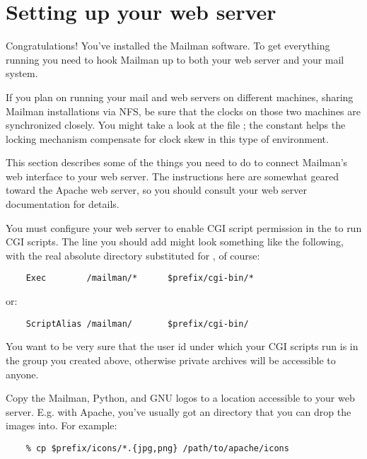 \documentclass{howto}
\begin{document}
\section{Setting up your web server}

Congratulations!  You've installed the Mailman software.  To get everything
running you need to hook Mailman up to both your web server and your mail
system.

If you plan on running your mail and web servers on different machines,
sharing Mailman installations via NFS, be sure that the clocks on those two
machines are synchronized closely.  You might take a look at the file
; the constant  helps the locking
mechanism compensate for clock skew in this type of environment.

This section describes some of the things you need to do to connect Mailman's
web interface to your web server.  The instructions here are somewhat geared
toward the Apache web server, so you should consult your web server
documentation for details.

You must configure your web server to enable CGI script permission in the
 to run CGI scripts.  The line you should add
might look something like the following, with the real absolute directory
substituted for , of course:

\begin{verbatim}
    Exec        /mailman/*      $prefix/cgi-bin/*
\end{verbatim}

  or:

\begin{verbatim}
    ScriptAlias /mailman/       $prefix/cgi-bin/
\end{verbatim}

\begin{notice}[warning]
You want to be very sure that the user id under which your CGI scripts run is
 in the  group you created above, otherwise private
archives will be accessible to anyone.
\end{notice}

Copy the Mailman, Python, and GNU logos to a location accessible to your web
server.  E.g. with Apache, you've usually got an  directory that
you can drop the images into.  For example:

\begin{verbatim}
    % cp $prefix/icons/*.{jpg,png} /path/to/apache/icons
\end{verbatim}
\end{document}
